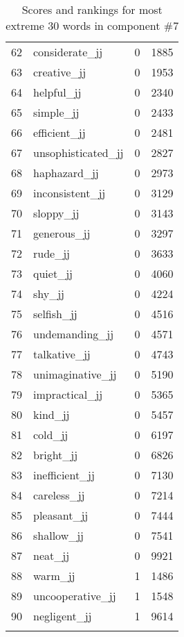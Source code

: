 \begin{longtable}[!htbp]{| rlr@{.}l |}
    62 & considerate\_jj & 0 & 1885 \\
    63 & creative\_jj & 0 & 1953 \\
    64 & helpful\_jj & 0 & 2340 \\
    65 & simple\_jj & 0 & 2433 \\
    66 & efficient\_jj & 0 & 2481 \\
    67 & unsophisticated\_jj & 0 & 2827 \\
    68 & haphazard\_jj & 0 & 2973 \\
    69 & inconsistent\_jj & 0 & 3129 \\
    70 & sloppy\_jj & 0 & 3143 \\
    71 & generous\_jj & 0 & 3297 \\
    72 & rude\_jj & 0 & 3633 \\
    73 & quiet\_jj & 0 & 4060 \\
    74 & shy\_jj & 0 & 4224 \\
    75 & selfish\_jj & 0 & 4516 \\
    76 & undemanding\_jj & 0 & 4571 \\
    77 & talkative\_jj & 0 & 4743 \\
    78 & unimaginative\_jj & 0 & 5190 \\
    79 & impractical\_jj & 0 & 5365 \\
    80 & kind\_jj & 0 & 5457 \\
    81 & cold\_jj & 0 & 6197 \\
    82 & bright\_jj & 0 & 6826 \\
    83 & inefficient\_jj & 0 & 7130 \\
    84 & careless\_jj & 0 & 7214 \\
    85 & pleasant\_jj & 0 & 7444 \\
    86 & shallow\_jj & 0 & 7541 \\
    87 & neat\_jj & 0 & 9921 \\
    88 & warm\_jj & 1 & 1486 \\
    89 & uncooperative\_jj & 1 & 1548 \\
    90 & negligent\_jj & 1 & 9614 \\
    \hline
    \caption{Scores and rankings for most extreme 30 words in component \#7} \\
\end{longtable}
